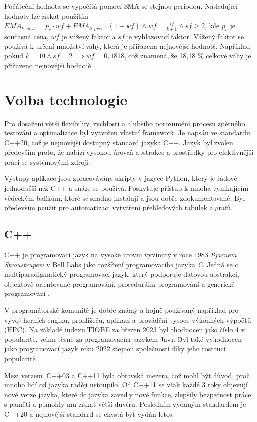 Počáteční hodnota se vypočítá pomocí SMA se stejnou periodou.
Následující hodnoty lze získat použitím
$EMA_{k, next} = p_c \cdot wf + EMA_{k, prev} \cdot (1-wf) \land wf=\frac{sf}{k+1} \land sf\geq2$, kde $p_c$ je současná cena, $wf$ je vážený faktor a $sf$ je vyhlazovací faktor.
Vážený faktor se používá k určení množství váhy, která je přiřazena nejnovější hodnotě.
Například pokud $k=10 \land sf=2 \implies wf = 0,1818$, což znamená, že 18,18 \% celkové váhy je přiřazeno nejnovější hodnotě \cite{ma-stockcharts}.

\chapter{Volba technologie}
Pro dosažení větší flexibility, rychlosti a hlubšího porozumění procesu zpětného testování a optimalizace byl vytvořen vlastní framework.
Je napsán ve standardu C++20, což je nejnovější dostupný standard jazyka C++.
Jazyk byl zvolen především proto, že nabízí vysokou úroveň abstrakce a prostředky pro efektivnější práci se systémovými zdroji.

Výstupy aplikace jsou zpracovávány skripty v jazyce Python, který je řádově jednodušší než C++ a snáze se používá.
Poskytuje přístup k mnoha vynikajícím vědeckým balíkům, které se snadno instalují a jsou dobře zdokumentované.
Byl především použit pro automatizaci vytváření přehledových tabulek a grafů.

\section{C++}
C++ je programovací jazyk na vysoké úrovni vyvinutý v roce 1983 \textit{Bjarnem Stroustrupem} v Bell Labs jako rozšíření programovacího jazyka \textit{C}.
Jedná se o multiparadigmatický programovací jazyk, který podporuje datovou abstrakci, objektově orientované programování, procedurální programování a generické programování \cite{cpp}.

V programátorské komunitě je dobře známý a hojně používaný například pro vývoj herních enginů, prohlížečů, aplikací a provádění vysoce-výkonných výpočtů (HPC).
Na základě indexu TIOBE za březen 2023 byl ohodnocen jako číslo 4 v popularitě, velmi těsně za programovacím jazykem Java.
Byl také vyhodnocen jako programovací jazyk roku 2022 stejnou společností díky jeho rostoucí popularitě  \cite{tiobe}.

Mezi verzemi C++03 a C++11 byla obrovská mezera, což mohl být důvod, proč mnoho lidí od jazyka raději ustoupilo.
Od C++11 se však každé 3 roky objevují nové verze jazyka, které do jazyka zavedly nové funkce, zlepšily bezpečnost práce s pamětí a pomohly mu získat větší důvěru.
Posledním vydaným standardem je C++20 a nejnovější standard se chystá být vydán letos.

